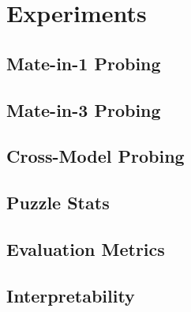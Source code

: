 \section{Experiments}

\subsection{Mate-in-1 Probing}

\subsection{Mate-in-3 Probing}

\subsection{Cross-Model Probing}

\subsection{Puzzle Stats}

\subsection{Evaluation Metrics}

\subsection{Interpretability}
